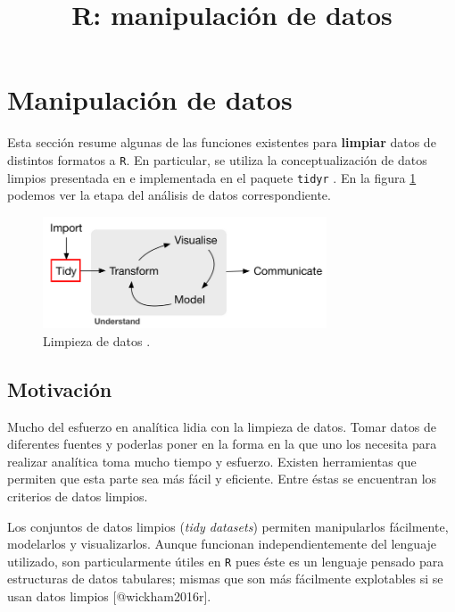 \documentclass[]{article}
\title{R: manipulación de datos}
\author{}
\date{}
\begin{document}
\maketitle

\section{Manipulación de datos}\label{manipulacion-de-datos}

Esta sección resume algunas de las funciones existentes para
\textbf{limpiar} datos de distintos formatos a \texttt{R}. En
particular, se utiliza la conceptualización de datos limpios presentada
en \textcite{wickham2014tidy} e implementada en el paquete
\texttt{tidyr} \parencite{tidyr}. En la figura \ref{fig:ciclo2} podemos
ver la etapa del análisis de datos correspondiente.

\begin{figure}[h]
    \centering
    \includegraphics[width=0.75\textwidth]{../img/02_ciclo_2.png}
    \caption{Limpieza de datos \textcite[Introducción]{grolemund2016r}.}
    \label{fig:ciclo2}
\end{figure}

\subsection{Motivación}\label{motivacion}

Mucho del esfuerzo en analítica lidia con la limpieza de datos. Tomar
datos de diferentes fuentes y poderlas poner en la forma en la que uno
los necesita para realizar analítica toma mucho tiempo y esfuerzo.
Existen herramientas que permiten que esta parte sea más fácil y
eficiente. Entre éstas se encuentran los criterios de datos limpios.

Los conjuntos de datos limpios (\emph{tidy datasets}) permiten
manipularlos fácilmente, modelarlos y visualizarlos. Aunque funcionan
independientemente del lenguaje utilizado, son particularmente útiles en
\texttt{R} pues éste es un lenguaje pensado para estructuras de datos
tabulares; mismas que son más fácilmente explotables si se usan datos
limpios {[}@wickham2016r{]}.
\end{document}
